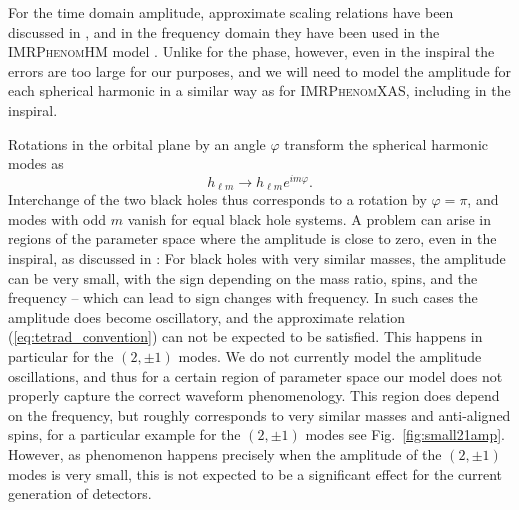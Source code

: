 \documentclass[twocolumn,prd,aps,superscriptaddress,preprintnumbers,tightenlines,showpacs,nofootinbib,eqsecnum,amsfonts,amsmath]{revtex4}
\newcommand{\phX}{\textsc{IMRPhenomXAS}\xspace}
\newcommand{\phHM}{\textsc{IMRPhenomHM}\xspace}
\begin{document}
For the time domain amplitude, approximate scaling relations have been discussed in \cite{Schnittman:2007ij,Baker:2008mj}, and in the frequency domain they have been used in the \phHM model \cite{London:2017bcn}. Unlike for the phase, however, even in the inspiral the errors are too large for our purposes, and we will need to model the amplitude for each spherical harmonic in a similar way as for \phX, including in the inspiral.

Rotations in the orbital plane by an angle $\varphi$ transform the spherical harmonic modes as %
\begin{equation}\label{eq:mode_rotation}
h_{\ell m} \rightarrow h_{\ell m} e^{i m  \varphi}.
\end{equation}
Interchange of the two black holes thus corresponds to a rotation by $\varphi=\pi$, and modes with odd $m$ vanish for equal black hole systems.
%
A problem can arise in regions of the parameter space where the amplitude is close to zero, even in the inspiral, as discussed in \cite{Cotesta:2018fcv,hybrids}: 
For black holes with very similar masses, the amplitude can be very small, with the sign depending on the mass ratio, spins, and the frequency -- which can lead to sign changes with frequency. In such cases the amplitude does become oscillatory, and the approximate relation (\ref{eq:tetrad_convention}) can not be expected to be satisfied. This happens in particular for the $(2,\pm 1)$ modes. We do not currently model the amplitude oscillations, and thus for a certain region of parameter space our model does not properly capture the correct waveform phenomenology. This region does depend on the frequency, but roughly corresponds to very similar masses and anti-aligned spins, for a particular example for the $(2,\pm1)$ modes see Fig.~\ref{fig:small21amp}. However, as phenomenon happens precisely when the amplitude of the  $(2,\pm1)$ modes is very small, this is not expected to be a significant effect for the current generation of detectors. 
\end{document}
